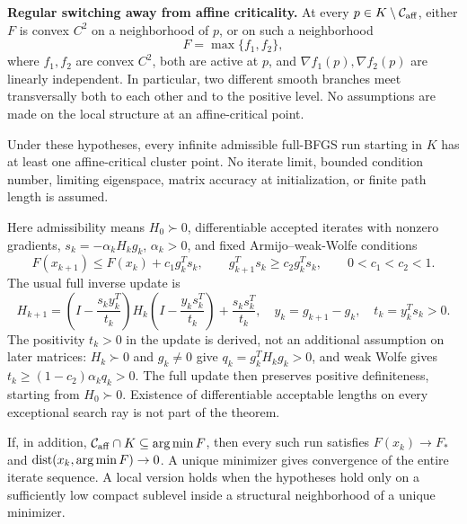 \textbf{Regular switching away from affine criticality.} At every $p\in K\setminus\mathcal C_{\rm aff}$, either $F$ is convex $C^2$ on a neighborhood of $p$, or on such a neighborhood
\[
 F=\max\{f_1,f_2\},
\]
where $f_1,f_2$ are convex $C^2$, both are active at $p$, and $\nabla f_1(p),\nabla f_2(p)$ are linearly independent. In particular, two different smooth branches meet transversally both to each other and to the positive level. No assumptions are made on the local structure at an affine-critical point.

\begin{theorem}\label{C:thm:cluster}
Under these hypotheses, every infinite admissible full-BFGS run starting in $K$ has at least one affine-critical cluster point. No iterate limit, bounded condition number, limiting eigenspace, matrix accuracy at initialization, or finite path length is assumed.
\end{theorem}

Here admissibility means $H_0\succ0$, differentiable accepted iterates with nonzero gradients, $s_k=-\alpha_kH_kg_k$, $\alpha_k>0$, and fixed Armijo--weak-Wolfe conditions
\begin{equation}\label{C:eq:AW}
 F(x_{k+1})\le F(x_k)+c_1g_k^Ts_k,\qquad
 g_{k+1}^Ts_k\ge c_2g_k^Ts_k,\qquad 0<c_1<c_2<1.
\end{equation}
The usual full inverse update is
\begin{equation}\label{C:eq:bfgs}
 H_{k+1}=\left(I-\frac{s_ky_k^T}{t_k}\right)H_k
 \left(I-\frac{y_ks_k^T}{t_k}\right)+\frac{s_ks_k^T}{t_k},\quad
 y_k=g_{k+1}-g_k,\quad t_k=y_k^Ts_k>0.
\end{equation}
The positivity $t_k>0$ in the update is derived, not an additional assumption on later matrices: $H_k\succ0$ and $g_k\ne0$ give $q_k=g_k^TH_kg_k>0$, and weak Wolfe gives $t_k\ge(1-c_2)\alpha_kq_k>0$. The full update then preserves positive definiteness, starting from $H_0\succ0$. Existence of differentiable acceptable lengths on every exceptional search ray is not part of the theorem.

\begin{corollary}\label{C:cor:AC}
If, in addition, $\mathcal C_{\rm aff}\cap K\subseteq\arg\min F$, then every such run satisfies $F(x_k)\to F_*$ and $\operatorname{dist}(x_k,\arg\min F)\to0$. A unique minimizer gives convergence of the entire iterate sequence. A local version holds when the hypotheses hold only on a sufficiently low compact sublevel inside a structural neighborhood of a unique minimizer.
\end{corollary}

